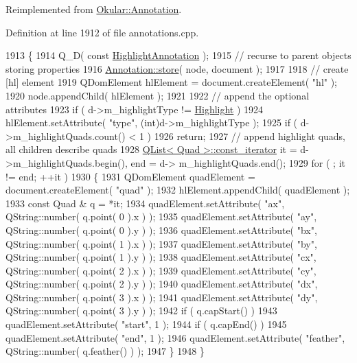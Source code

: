 Reimplemented from \hyperlink{classOkular_1_1Annotation_abbb607cf5929ffd06f789a22b353dcb3}{Okular\+::\+Annotation}.



Definition at line 1912 of file annotations.\+cpp.


\begin{DoxyCode}
1913 \{
1914     Q\_D( \textcolor{keyword}{const} \hyperlink{classOkular_1_1HighlightAnnotation}{HighlightAnnotation} );
1915     \textcolor{comment}{// recurse to parent objects storing properties}
1916     \hyperlink{classOkular_1_1Annotation_abbb607cf5929ffd06f789a22b353dcb3}{Annotation::store}( node, document );
1917 
1918     \textcolor{comment}{// create [hl] element}
1919     QDomElement hlElement = document.createElement( \textcolor{stringliteral}{"hl"} );
1920     node.appendChild( hlElement );
1921 
1922     \textcolor{comment}{// append the optional attributes}
1923     \textcolor{keywordflow}{if} ( d->m\_highlightType != \hyperlink{classOkular_1_1HighlightAnnotation_a63d2488735d1d6320e2e118743243999a250833fcd89a56dd46955dc287e1a3af}{Highlight} )
1924         hlElement.setAttribute( \textcolor{stringliteral}{"type"}, (\textcolor{keywordtype}{int})d->m\_highlightType );
1925     \textcolor{keywordflow}{if} ( d->m\_highlightQuads.count() < 1 )
1926         \textcolor{keywordflow}{return};
1927     \textcolor{comment}{// append highlight quads, all children describe quads}
1928     \hyperlink{classQList}{QList< Quad >::const\_iterator} it = d->m\_highlightQuads.begin(), end = d->
      m\_highlightQuads.end();
1929     \textcolor{keywordflow}{for} ( ; it != end; ++it )
1930     \{
1931         QDomElement quadElement = document.createElement( \textcolor{stringliteral}{"quad"} );
1932         hlElement.appendChild( quadElement );
1933         \textcolor{keyword}{const} Quad & q = *it;
1934         quadElement.setAttribute( \textcolor{stringliteral}{"ax"}, QString::number( q.point( 0 ).x ) );
1935         quadElement.setAttribute( \textcolor{stringliteral}{"ay"}, QString::number( q.point( 0 ).y ) );
1936         quadElement.setAttribute( \textcolor{stringliteral}{"bx"}, QString::number( q.point( 1 ).x ) );
1937         quadElement.setAttribute( \textcolor{stringliteral}{"by"}, QString::number( q.point( 1 ).y ) );
1938         quadElement.setAttribute( \textcolor{stringliteral}{"cx"}, QString::number( q.point( 2 ).x ) );
1939         quadElement.setAttribute( \textcolor{stringliteral}{"cy"}, QString::number( q.point( 2 ).y ) );
1940         quadElement.setAttribute( \textcolor{stringliteral}{"dx"}, QString::number( q.point( 3 ).x ) );
1941         quadElement.setAttribute( \textcolor{stringliteral}{"dy"}, QString::number( q.point( 3 ).y ) );
1942         \textcolor{keywordflow}{if} ( q.capStart() )
1943             quadElement.setAttribute( \textcolor{stringliteral}{"start"}, 1 );
1944         \textcolor{keywordflow}{if} ( q.capEnd() )
1945             quadElement.setAttribute( \textcolor{stringliteral}{"end"}, 1 );
1946         quadElement.setAttribute( \textcolor{stringliteral}{"feather"}, QString::number( q.feather() ) );
1947     \}
1948 \}
\end{DoxyCode}
